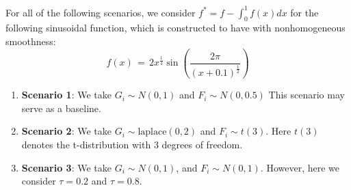 \documentclass[twoside,11pt]{article}
\newcommand{\rev}[1]{{\color{revisionred}#1}}
\begin{document}
\rev{For all of the following scenarios}, we consider \( f^* = f - \int_{0}^{1} f(x)dx \) for the following \rev{sinusoidal} function, which is constructed to have with \rev{nonhomogeneous} smoothness:
\[
    f(x) \,=\, 
    2x^{\frac{1}{4}} \sin \left( \frac{2\pi}{(x+0.1)^{\frac{1}{2}}} \right)
\]




    

\begin{enumerate}
    
\item \textbf{Scenario 1}: We take $G_i\sim N(0, 1)$ and $F_i\sim N(0, 0.5)$ This scenario may serve as a baseline. 

\item \textbf{Scenario 2}: We take $G_i\sim \text{laplace}(0, 2)$ and $F_i\sim t(3)$. Here $t(3)$ denotes the t-distribution with 3 degrees of freedom. 

 

\item \textbf{Scenario 3}: We take $G_i\sim N(0, 1)$, and $F_i\sim N(0, 1)$. However, here we consider $\tau = 0.2$ and $\tau = 0.8$. 

\end{enumerate}
\end{document}
